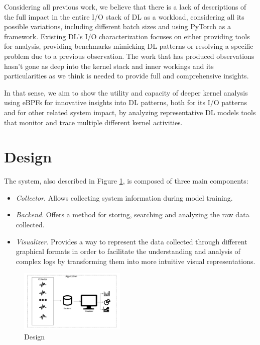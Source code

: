 \documentclass[conference]{IEEEtran}
\begin{document}
Considering all previous work, we believe that there is a lack of descriptions of the full impact in the entire I/O stack of DL as a workload, considering all its possible variations, including different batch sizes and using PyTorch as a framework. Existing DL's I/O characterization focuses on either providing tools for analysis, providing benchmarks mimicking DL patterns or resolving a specific problem due to a previous observation. The work that has produced observations hasn't gone as deep into the kernel stack and inner workings and its particularities as we think is needed to provide full and comprehensive insights.

In that sense, we aim to show the utility and capacity of deeper kernel analysis using eBPFs for innovative insights into DL patterns, both for its I/O patterns and for other related system impact, by analyzing representative DL models tools that monitor and trace multiple different kernel activities.

\section{Design}
The system, also described in Figure \ref{fig:Design}, is composed of three main components:
\begin{itemize}
	\item \textit{Collector}. Allows collecting system information during model training.
	\item \textit{Backend}. Offers a method for storing, searching and analyzing the raw data collected.
	\item \textit{Visualizer}. Provides a way to represent the data collected through different graphical formats in order to facilitate the understanding and analysis of complex logs by transforming them into more intuitive visual representations.
\end{itemize}

\begin{figure}[htbp]
	\centering
	\includegraphics[width=0.45\textwidth]{images/DesignPIV3.pdf}
	\caption{Design}
	\label{fig:Design}
\end{figure}
\end{document}
